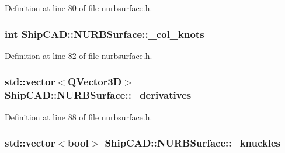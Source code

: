 Definition at line 80 of file nurbsurface.\+h.

\subsubsection[{\texorpdfstring{\+\_\+col\+\_\+knots}{_col_knots}}]{\setlength{\rightskip}{0pt plus 5cm}int Ship\+C\+A\+D\+::\+N\+U\+R\+B\+Surface\+::\+\_\+col\+\_\+knots\hspace{0.3cm}{\ttfamily [protected]}}\hypertarget{classShipCAD_1_1NURBSurface_a2b0e2649a54a57a9ae6fbeed031b04d0}{}\label{classShipCAD_1_1NURBSurface_a2b0e2649a54a57a9ae6fbeed031b04d0}


Definition at line 82 of file nurbsurface.\+h.

\subsubsection[{\texorpdfstring{\+\_\+derivatives}{_derivatives}}]{\setlength{\rightskip}{0pt plus 5cm}std\+::vector$<$Q\+Vector3D$>$ Ship\+C\+A\+D\+::\+N\+U\+R\+B\+Surface\+::\+\_\+derivatives\hspace{0.3cm}{\ttfamily [protected]}}\hypertarget{classShipCAD_1_1NURBSurface_a6fa7cce7b1c78fc8fc89be24cba4d9b0}{}\label{classShipCAD_1_1NURBSurface_a6fa7cce7b1c78fc8fc89be24cba4d9b0}


Definition at line 88 of file nurbsurface.\+h.

\subsubsection[{\texorpdfstring{\+\_\+knuckles}{_knuckles}}]{\setlength{\rightskip}{0pt plus 5cm}std\+::vector$<$bool$>$ Ship\+C\+A\+D\+::\+N\+U\+R\+B\+Surface\+::\+\_\+knuckles\hspace{0.3cm}{\ttfamily [protected]}}\hypertarget{classShipCAD_1_1NURBSurface_a6f1765a2698b4ed79f0d110409129c28}{}\label{classShipCAD_1_1NURBSurface_a6f1765a2698b4ed79f0d110409129c28}


